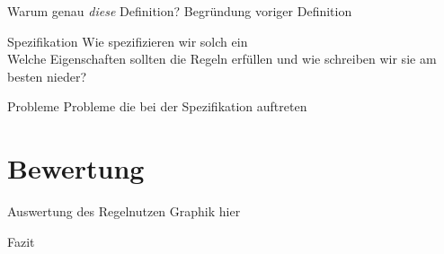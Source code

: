 \documentclass{beamer}
\begin{document}
    \begin{frame}{Warum genau \textit{diese} Definition?}
        Begründung voriger Definition
    \end{frame}

    \begin{frame}{Spezifikation}
        Wie spezifizieren wir solch ein \sls \\
        Welche Eigenschaften sollten die Regeln erfüllen und wie schreiben wir sie am besten nieder?
    \end{frame}

    \begin{frame}{Probleme}
        Probleme die bei der Spezifikation auftreten
    \end{frame}

    \section{Bewertung}
    \label{sec:bewertung}
    \begin{frame}{Auswertung des Regelnutzen}
        Graphik hier
    \end{frame}

    \begin{frame}{Fazit}

    \end{frame}
\end{document}
